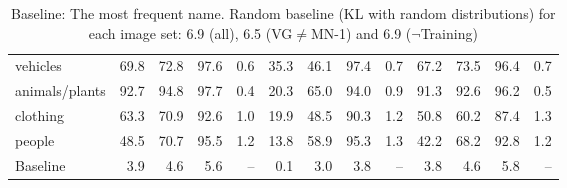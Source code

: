 \begin{table*}
\begin{tabular}{l@{~}|@{~}r@{~}r@{~}rr@{~}|@{~}r@{~}r@{~}rr@{~}|@{~}r@{~}r@{~}rr}
vehicles       &               69.8 &                 72.8 &                   97.6 &            0.6 &            35.3 &              46.1 &                97.4 &         0.7 &             67.2 &               73.5 &                 96.4 &          0.7 \\
animals/plants &               92.7 &                 94.8 &                   97.7 &            0.4 &            20.3 &              65.0 &                94.0 &         0.9 &             91.3 &               92.6 &                 96.2 &          0.5 \\
clothing       &               63.3 &                 70.9 &                   92.6 &            1.0 &            19.9 &              48.5 &                90.3 &         1.2 &             50.8 &               60.2 &                 87.4 &          1.3 \\
people         &               48.5 &                 70.7 &                   95.5 &            1.2 &            13.8 &              58.9 &                95.3 &         1.3 &             42.2 &               68.2 &                 92.8 &          1.2 \\
\bottomrule
Baseline       &                3.9 &                  4.6 &                    5.6 &            -- &             0.1 &               3.0 &                 3.8 &         -- &              3.8 &                4.6 &                  5.8 &          -- \\
\end{tabular}
\caption{Baseline: The most frequent name. Random baseline (KL with random distributions) for each image set: 6.9 (all), 6.5 (VG$\neq$MN-1) and 6.9 ($\neg$Training)	\label{tab:model}}
\end{table*}


